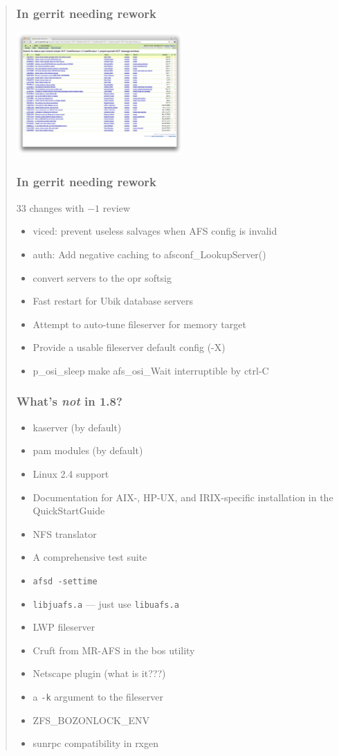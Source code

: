 \documentclass{beamer}
\begin{document}
\begin{frame}[fragile]
\begin{quote}
\begin{frame}
\begin{frame}
\frametitle{In gerrit needing rework}
\includegraphics[width=2.5in]{gerrit-minusone}
\end{frame}

\begin{frame}
\frametitle{In gerrit needing rework}
33 changes with $-1$ review
\begin{itemize}
\item{viced: prevent useless salvages when AFS config is invalid}
\item{auth: Add negative caching to afsconf_LookupServer()}
\item{convert servers to the opr softsig}
\item{Fast restart for Ubik database servers}
\pause
\item{Attempt to auto-tune fileserver for memory target}
\item{Provide a usable fileserver default config (-X)}
\pause
\item{p_osi_sleep make afs_osi_Wait interruptible by ctrl-C}
\end{itemize}
\end{frame}

\begin{frame}
\frametitle{What's {\em not} in 1.8?}
\begin{itemize}
\item{kaserver (by default)}
\item{pam modules (by default)}
\item{Linux 2.4 support}
\item{Documentation for AIX-, HP-UX, and IRIX-specific installation in the
QuickStartGuide}
\item{NFS translator}
\item{A comprehensive test suite}
\item{\verb+afsd -settime+}
\item{\verb+libjuafs.a+ --- just use \verb+libuafs.a+}
\item{LWP fileserver}
\item{Cruft from MR-AFS in the bos utility}
\item{Netscape plugin (what is it???)}
\item{a \verb+-k+ argument to the fileserver}
\item{ZFS_BOZONLOCK_ENV}
\item{sunrpc compatibility in rxgen}
\end{itemize}
\end{frame}


\end{frame}
\end{quote}
\end{frame}
\end{document}
